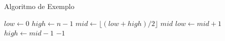 

\begin{algorithm}
\caption{Algoritmo de Exemplo}
\label{alg:exemplo}
\begin{algorithmic}[1]
    \State $low \gets 0$
    \State $high \gets n - 1$
        \State $mid \gets \lfloor (low + high) / 2 \rfloor$
            \State \Return $mid$
            \State $low \gets mid + 1$
        \Else
            \State $high \gets mid - 1$
        \EndIf
    \EndWhile
    \State \Return $-1$
\EndProcedure
\end{algorithmic}
\end{algorithm}



